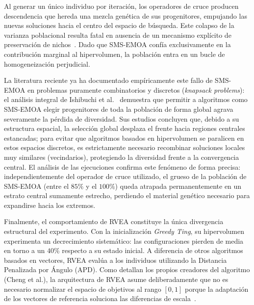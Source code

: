 Al generar un único individuo por iteración, los operadores de cruce producen descendencia que hereda una mezcla genética de sus progenitores, empujando las nuevas soluciones hacia el centro del espacio de búsqueda. Este colapso de la varianza poblacional resulta fatal en ausencia de un mecanismo explícito de preservación de nichos~\cite{deb2001multi}. Dado que SMS-EMOA confía exclusivamente en la contribución marginal al hipervolumen, la población entra en un bucle de homogeneización perjudicial. 

La literatura reciente ya ha documentado empíricamente este fallo de SMS-EMOA en problemas puramente combinatorios y discretos (\textit{knapsack problems}): el análisis integral de Ishibuchi et al.~\cite{ishibuchi2015behavior} demuestra que permitir a algoritmos como SMS-EMOA elegir progenitores de toda la población de forma global agrava severamente la pérdida de diversidad. Sus estudios concluyen que, debido a su estructura espacial, la selección global desplaza el frente hacia regiones centrales estancadas; para evitar que algoritmos basados en hipervolumen se paralicen en estos espacios discretos, es estrictamente necesario recombinar soluciones locales muy similares (vecindarios), protegiendo la diversidad frente a la convergencia central. El análisis de las ejecuciones confirma este fenómeno de forma precisa: independientemente del operador de cruce utilizado, el grueso de la población de SMS-EMOA (entre el $85\%$ y el $100\%$) queda atrapada permanentemente en un estrato central sumamente estrecho, perdiendo el material genético necesario para expandirse hacia los extremos.

Finalmente, el comportamiento de RVEA constituye la única divergencia estructural del experimento. Con la inicialización \textit{Greedy Ting}, su hipervolumen experimenta un decrecimiento sistemático: las configuraciones pierden de media en torno a un $40$\% respecto a su estado inicial. A diferencia de otros algoritmos basados en vectores, RVEA evalúa a los individuos utilizando la Distancia Penalizada por Ángulo (APD). Como detallan los propios creadores del algoritmo (Cheng et al.), la arquitectura de RVEA asume deliberadamente que no es necesario normalizar el espacio de objetivos al rango $[0, 1]$ porque la adaptación de los vectores de referencia soluciona las diferencias de escala~\cite{cheng2016reference}.

